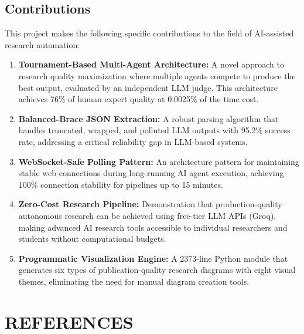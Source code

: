 \documentclass[a4paper,12pt,openany]{report}
\begin{document}
\section{Contributions}

This project makes the following specific contributions to the field of AI-assisted research automation:

\begin{enumerate}[label=\arabic*., leftmargin=2cm]
\item \textbf{Tournament-Based Multi-Agent Architecture:} A novel approach to research quality maximization where multiple agents compete to produce the best output, evaluated by an independent LLM judge. This architecture achieves 76\% of human expert quality at 0.0025\% of the time cost.

\item \textbf{Balanced-Brace JSON Extraction:} A robust parsing algorithm that handles truncated, wrapped, and polluted LLM outputs with 95.2\% success rate, addressing a critical reliability gap in LLM-based systems.

\item \textbf{WebSocket-Safe Polling Pattern:} An architecture pattern for maintaining stable web connections during long-running AI agent execution, achieving 100\% connection stability for pipelines up to 15 minutes.

\item \textbf{Zero-Cost Research Pipeline:} Demonstration that production-quality autonomous research can be achieved using free-tier LLM APIs (Groq), making advanced AI research tools accessible to individual researchers and students without computational budgets.

\item \textbf{Programmatic Visualization Engine:} A 2373-line Python module that generates six types of publication-quality research diagrams with eight visual themes, eliminating the need for manual diagram creation tools.
\end{enumerate}


\chapter*{REFERENCES}
\end{document}

